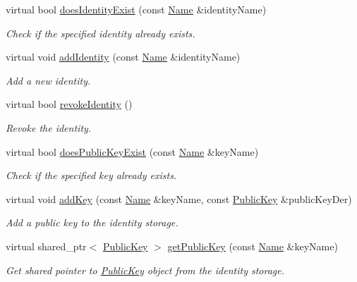 \begin{DoxyCompactItemize}
\item 
virtual bool \hyperlink{classndn_1_1SecPublicInfoSqlite3_aa0acd6df14788c00b0668c51755dfcbe}{does\+Identity\+Exist} (const \hyperlink{classndn_1_1Name}{Name} \&identity\+Name)
\begin{DoxyCompactList}\small\item\em Check if the specified identity already exists. \end{DoxyCompactList}\item 
virtual void \hyperlink{classndn_1_1SecPublicInfoSqlite3_adc4cc468772fc4e5c3510b6aeb44e465}{add\+Identity} (const \hyperlink{classndn_1_1Name}{Name} \&identity\+Name)
\begin{DoxyCompactList}\small\item\em Add a new identity. \end{DoxyCompactList}\item 
virtual bool \hyperlink{classndn_1_1SecPublicInfoSqlite3_ab486ef79859b8db9915ae5279376a8bf}{revoke\+Identity} ()
\begin{DoxyCompactList}\small\item\em Revoke the identity. \end{DoxyCompactList}\item 
virtual bool \hyperlink{classndn_1_1SecPublicInfoSqlite3_a067587d1cb0f020fd93d8bce0c4cb1eb}{does\+Public\+Key\+Exist} (const \hyperlink{classndn_1_1Name}{Name} \&key\+Name)
\begin{DoxyCompactList}\small\item\em Check if the specified key already exists. \end{DoxyCompactList}\item 
virtual void \hyperlink{classndn_1_1SecPublicInfoSqlite3_a8f3c33baff9fa817c4c9fcef5389e697}{add\+Key} (const \hyperlink{classndn_1_1Name}{Name} \&key\+Name, const \hyperlink{classndn_1_1PublicKey}{Public\+Key} \&public\+Key\+Der)
\begin{DoxyCompactList}\small\item\em Add a public key to the identity storage. \end{DoxyCompactList}\item 
virtual shared\+\_\+ptr$<$ \hyperlink{classndn_1_1PublicKey}{Public\+Key} $>$ \hyperlink{classndn_1_1SecPublicInfoSqlite3_a9fa5c3f66c986a40151b3729e33ee636}{get\+Public\+Key} (const \hyperlink{classndn_1_1Name}{Name} \&key\+Name)
\begin{DoxyCompactList}\small\item\em Get shared pointer to \hyperlink{classndn_1_1PublicKey}{Public\+Key} object from the identity storage. \end{DoxyCompactList}\item 

\end{DoxyCompactItemize}
